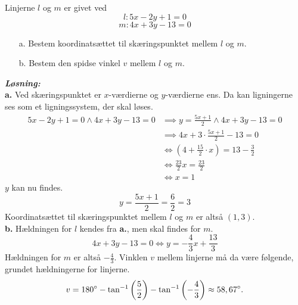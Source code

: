 \documentclass{article}
\newcommand{\sol}{\setlength{\parindent}{0cm}\textbf{\textit{Løsning:}}\setlength{\parindent}{1cm}}
\begin{document}
\begin{question}{}{}
Linjerne $l$ og $m$ er givet ved
\[
  l: 5x-2y+1=0
\] 
\[
  m: 4x+3y-13=0
\] 
\begin{itemize}
  \item[a.] Bestem koordinatsættet til skæringspunktet mellem $l$ og $m$.
  \item[b.] Bestem den spidse vinkel $v$ mellem $l$ og $m$. 
\end{itemize}
\end{question}
\sol \\ 
\textbf{a.} Ved skæringspunktet er $x$-værdierne og $y$-værdierne ens. Da kan ligningerne ses som et ligningssystem, der skal løses. 
\begin{equation*}
\begin{split}
  5x-2y+1=0\land 4x+3y-13=0 &\implies y=\frac{5x+1}{2}\land 4x+3y-13=0 \\ 
  &\implies 4x + 3\cdot \frac{5x+1}{2} -13=0 \\ 
  &\iff (4+\frac{15}{2}\cdot x)=13-\frac{3}{2} \\ 
  &\iff \frac{23}{2}x=\frac{23}{2}\\ 
  &\iff x=1
\end{split}
\end{equation*}
$y$ kan nu findes.
\[
y=\frac{5x+1}{2}=\frac{6}{2}=3
\] 
Koordinatsættet til skæringspunktet mellem $l$ og $m$ er altså $(1,3)$. \\[1ex]
\textbf{b.} 
Hældningen for $l$ kendes fra \textbf{a.}, men skal findes for $m$.
\[
4x+3y-13=0 \iff y=-\frac{4}{3}x+\frac{13}{3}
\] 
Hældningen for $m$ er altså $-\frac{4}{3}$.
Vinklen $v$ mellem linjerne må da være følgende, grundet hældningerne for linjerne.
\[
v=180\degree - \tan^{-1}\left(\frac{5}{2}\right)-\tan^{-1}\left(-\frac{4}{3}\right) \approx 58,67\degree. 
\] 
\end{document}
